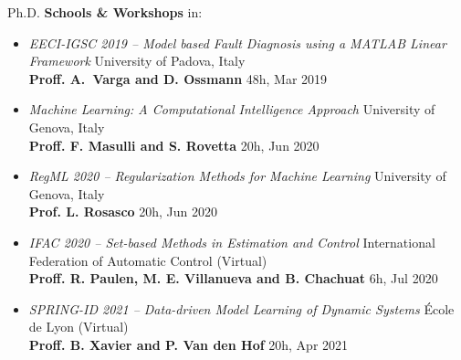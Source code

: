 \documentclass[10pt]{article}
\begin{document}
Ph.D. \textbf{Schools \& Workshops} in:
\begin{itemize}
	\setlength\itemsep{-6pt}
	\renewcommand\labelitemi{$\vcenter{\hbox{\tiny$\bullet$}}$}

	\item \textit{EECI-IGSC 2019 -- Model based Fault Diagnosis using a MATLAB Linear Framework} \hfill University of Padova, Italy\\
	\textbf{Proff. A. Varga and D. Ossmann} \hfill 48h, Mar 2019\\

	\item \textit{Machine Learning: A Computational Intelligence Approach} \hfill University of Genova, Italy\\
	\textbf{Proff. F. Masulli and S. Rovetta} \hfill 20h, Jun 2020\\
	
	\item \textit{RegML 2020 -- Regularization Methods for Machine Learning} \hfill University of Genova, Italy\\
	\textbf{Prof. L. Rosasco} \hfill 20h, Jun 2020\\

	\item \textit{IFAC 2020 -- Set-based Methods in Estimation and Control} \hfill International Federation of Automatic Control (Virtual)\\
	\textbf{Proff. R. Paulen, M. E. Villanueva and B. Chachuat} \hfill 6h, Jul 2020\\

	\item \textit{SPRING-ID 2021 -- Data-driven Model Learning of Dynamic Systems} \hfill École de Lyon (Virtual)\\
	\textbf{Proff. B. Xavier and P. Van den Hof} \hfill 20h, Apr 2021\\



\end{itemize}
\end{document}
